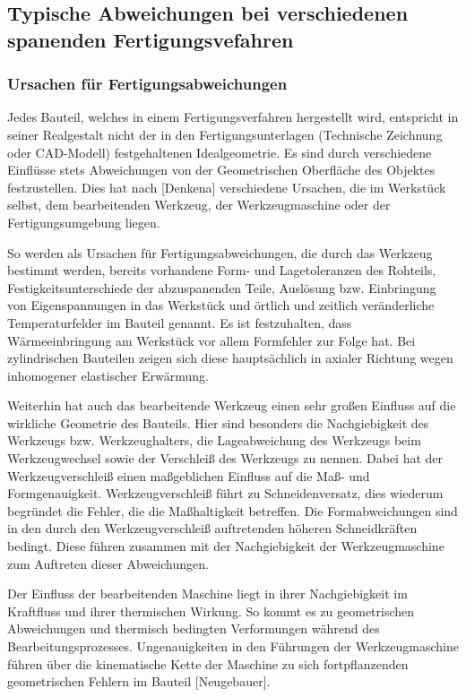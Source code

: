 \subsection{Typische Abweichungen bei verschiedenen spanenden Fertigungsvefahren}

\subsubsection{Ursachen für Fertigungsabweichungen}

Jedes Bauteil, welches in einem Fertigungsverfahren hergestellt wird, entspricht in seiner Realgestalt nicht der in den Fertigungsunterlagen (Technische Zeichnung oder CAD-Modell) festgehaltenen Idealgeometrie. Es sind durch verschiedene Einflüsse stets Abweichungen von der Geometrischen Oberfläche des Objektes festzustellen. Dies hat nach [Denkena] verschiedene Ursachen, die im Werkstück selbst, dem bearbeitenden Werkzeug, der Werkzeugmaschine oder der Fertigungsumgebung liegen. 

So werden als Ursachen für Fertigungsabweichungen, die durch das Werkzeug bestimmt werden, bereits vorhandene Form- und Lagetoleranzen des Rohteils, Festigkeitsunterschiede der abzuspanenden Teile, Auslösung bzw. Einbringung von Eigenspannungen in das Werkstück und örtlich und zeitlich veränderliche Temperaturfelder im Bauteil genannt.
Es ist festzuhalten, dass Wärmeeinbringung am Werkstück vor allem Formfehler zur Folge hat. Bei zylindrischen Bauteilen zeigen sich diese hauptsächlich in axialer Richtung wegen inhomogener elastischer Erwärmung.

Weiterhin hat auch das bearbeitende Werkzeug einen sehr großen Einfluss auf die wirkliche Geometrie des Bauteils. Hier sind besonders die Nachgiebigkeit des Werkzeugs bzw. Werkzeughalters, die Lageabweichung des Werkzeugs beim Werkzeugwechsel sowie der Verschleiß des Werkzeugs zu nennen. Dabei hat der Werkzeugverschleiß einen maßgeblichen Einfluss auf die Maß- und Formgenauigkeit. Werkzeugverschleiß führt zu Schneidenversatz, dies wiederum begründet die Fehler, die die Maßhaltigkeit betreffen. Die Formabweichungen sind in den durch den Werkzeugverschleiß auftretenden höheren Schneidkräften bedingt. Diese führen zusammen mit der Nachgiebigkeit der Werkzeugmaschine zum Auftreten dieser Abweichungen.

Der Einfluss der bearbeitenden Maschine liegt in ihrer Nachgiebigkeit im Kraftfluss und ihrer thermischen Wirkung. So kommt es zu geometrischen Abweichungen und thermisch bedingten Verformungen während des Bearbeitungsprozesses. Ungenauigkeiten in den Führungen der Werkzeugmaschine führen über die kinematische Kette der Maschine zu sich fortpflanzenden geometrischen Fehlern im Bauteil [Neugebauer].

